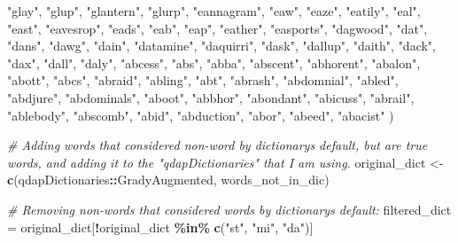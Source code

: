 \documentclass[
]{article}
\newenvironment{Shaded}{\begin{snugshade}}{\end{snugshade}}
\newcommand{\CommentTok}[1]{\textcolor[rgb]{0.56,0.35,0.01}{\textit{#1}}}
\newcommand{\FunctionTok}[1]{\textcolor[rgb]{0.13,0.29,0.53}{\textbf{#1}}}
\newcommand{\NormalTok}[1]{#1}
\newcommand{\OtherTok}[1]{\textcolor[rgb]{0.56,0.35,0.01}{#1}}
\newcommand{\SpecialCharTok}[1]{\textcolor[rgb]{0.81,0.36,0.00}{\textbf{#1}}}
\newcommand{\StringTok}[1]{\textcolor[rgb]{0.31,0.60,0.02}{#1}}
\begin{document}
\begin{Shaded}
\begin{Highlighting}[]
                     \StringTok{"glay"}\NormalTok{, }\StringTok{"glup"}\NormalTok{, }\StringTok{"glantern"}\NormalTok{, }\StringTok{"glurp"}\NormalTok{,}
                     \StringTok{"eannagram"}\NormalTok{, }\StringTok{"eaw"}\NormalTok{, }\StringTok{"eaze"}\NormalTok{, }\StringTok{"eatily"}\NormalTok{, }\StringTok{"eal"}\NormalTok{, }\StringTok{"east"}\NormalTok{, }\StringTok{"eavesrop"}\NormalTok{, }\StringTok{"eads"}\NormalTok{, }\StringTok{"eab"}\NormalTok{,}
                     \StringTok{"eap"}\NormalTok{, }\StringTok{"eather"}\NormalTok{, }\StringTok{"easports"}\NormalTok{, }
                     \StringTok{"dagwood"}\NormalTok{, }\StringTok{"dat"}\NormalTok{, }\StringTok{"dans"}\NormalTok{, }\StringTok{"dawg"}\NormalTok{, }\StringTok{"dain"}\NormalTok{, }\StringTok{"datamine"}\NormalTok{, }\StringTok{"daquirri"}\NormalTok{, }\StringTok{"dask"}\NormalTok{, }\StringTok{"dallup"}\NormalTok{,}
                     \StringTok{"daith"}\NormalTok{, }\StringTok{"dack"}\NormalTok{, }\StringTok{"dax"}\NormalTok{, }\StringTok{"dall"}\NormalTok{, }\StringTok{"daly"}\NormalTok{,}
                     \StringTok{"abcess"}\NormalTok{, }\StringTok{"abs"}\NormalTok{, }\StringTok{"abba"}\NormalTok{, }\StringTok{"abscent"}\NormalTok{, }\StringTok{"abhorent"}\NormalTok{, }\StringTok{"abalon"}\NormalTok{, }\StringTok{"abott"}\NormalTok{, }\StringTok{"abcs"}\NormalTok{, }\StringTok{"abraid"}\NormalTok{,}
                     \StringTok{"abling"}\NormalTok{, }\StringTok{"abt"}\NormalTok{, }\StringTok{"abrash"}\NormalTok{, }\StringTok{"abdomnial"}\NormalTok{, }\StringTok{"abled"}\NormalTok{, }\StringTok{"abdjure"}\NormalTok{, }\StringTok{"abdominals"}\NormalTok{, }\StringTok{"aboot"}\NormalTok{,}
                     \StringTok{"abbhor"}\NormalTok{, }\StringTok{"abondant"}\NormalTok{, }\StringTok{"abicuss"}\NormalTok{, }\StringTok{"abrail"}\NormalTok{, }\StringTok{"ablebody"}\NormalTok{, }\StringTok{"abscomb"}\NormalTok{, }\StringTok{"abid"}\NormalTok{, }\StringTok{"abduction"}\NormalTok{,}
                     \StringTok{"abor"}\NormalTok{, }\StringTok{"abeed"}\NormalTok{, }\StringTok{"abacist"} 
\NormalTok{                     )}

\CommentTok{\# Adding words that considered non{-}word by dictionary\textquotesingle{}s default, but are true words, and adding it to the "qdapDictionaries" that I am using.}
\NormalTok{original\_dict }\OtherTok{\textless{}{-}} \FunctionTok{c}\NormalTok{(qdapDictionaries}\SpecialCharTok{::}\NormalTok{GradyAugmented, words\_not\_in\_dic)}

\CommentTok{\# Removing non{-}words that considered words by dictionary\textquotesingle{}s default: }
\NormalTok{filtered\_dict }\OtherTok{=}\NormalTok{ original\_dict[}\SpecialCharTok{!}\NormalTok{original\_dict }\SpecialCharTok{\%in\%} \FunctionTok{c}\NormalTok{(}\StringTok{"st"}\NormalTok{, }\StringTok{"mi"}\NormalTok{, }\StringTok{"da"}\NormalTok{)]}


\end{Highlighting}
\end{Shaded}
\end{document}
